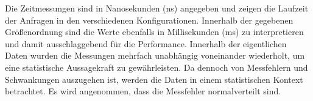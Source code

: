 \begin{table}[!htp]
    \centering
    \caption{Auszug der Daten der Performance-Messung.}
    \label{tab:performance-data}
\end{table}

Die Zeitmessungen sind in Nanosekunden (ns) angegeben und zeigen die Laufzeit der Anfragen in den verschiedenen Konfigurationen.
Innerhalb der gegebenen Größenordnung sind die Werte ebenfalls in Millisekunden (ms) zu interpretieren und damit ausschlaggebend für die Performance.
Innerhalb der eigentlichen Daten wurden die Messungen mehrfach unabhängig voneinander wiederholt, um eine statistische Aussagekraft zu gewährleisten.
Da dennoch von Messfehlern und Schwankungen auszugehen ist, werden die Daten in einem statistischen Kontext betrachtet.
Es wird angenommen, dass die Messfehler normalverteilt sind.

